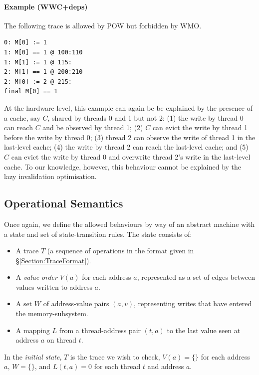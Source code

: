 \documentclass[11pt]{article}
\begin{document}
\paragraph{Example (WWC+deps)} The following trace is allowed by POW
but forbidden by WMO.

\begin{verbatim}
0: M[0] := 1
1: M[0] == 1 @ 100:110
1: M[1] := 1 @ 115:
2: M[1] == 1 @ 200:210
2: M[0] := 2 @ 215:
final M[0] == 1
\end{verbatim}

\noindent At the hardware level, this example can again be be
explained by the presence of a cache, say $C$, shared by threads 0 and
1 but not 2: (1) the write by thread 0 can reach $C$ and be
observed by thread 1; (2) $C$ can evict the write by thread 1 before
the write by thread 0; (3) thread 2 can observe the write of thread 1
in the last-level cache; (4) the write by thread 2 can reach the
last-level cache; and (5) $C$ can evict the write by thread 0 and
overwrite thread 2's write in the last-level cache.  To our knowledge,
however, this behaviour cannot be explained by the lazy invalidation
optimisation.

\subsection*{Operational Semantics}

Once again, we define the allowed behaviours by way of an abstract
machine with a state and set of state-transition rules.  The state
consists of:

\begin{itemize}

\item A trace $T$ (a sequence of operations in the format given in
\S\ref{Section:TraceFormat}).

\item A \emph{value order} $V(a)$ for each address $a$, represented as
a set of edges between values written to address $a$.

\item A set $W$ of address-value pairs $(a, v)$, representing writes
that have entered the memory-subsystem.

\item A mapping $L$ from a thread-address pair $(t,a)$ to the last
value seen at address $a$ on thread $t$.

\end{itemize}

In the \emph{initial state}, $T$ is the trace we wish to check, $V(a)
= \{\}$ for each address $a$, $W = \{\}$, and $L(t,a) = 0$ for each
thread $t$ and address $a$.
\end{document}
